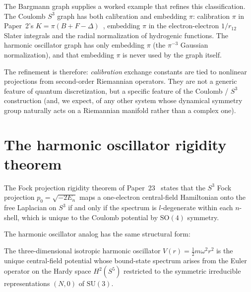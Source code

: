 \documentclass[twocolumn,pra,amsmath,amssymb,superscriptaddress]{revtex4-2}
\begin{document}
The Bargmann graph supplies a worked example that refines this
classification.  The Coulomb $S^3$ graph has both calibration and
embedding $\pi$: calibration $\pi$ in Paper~2's $K = \pi(B + F -
\Delta)$~\cite{paper2_alpha}, embedding $\pi$ in the
electron-electron $1/r_{12}$ Slater integrals and the radial
normalization of hydrogenic functions.  The harmonic oscillator
graph has only embedding $\pi$ (the $\pi^{-3}$ Gaussian
normalization), and that embedding $\pi$ is never used by the
graph itself.

The refinement is therefore: \emph{calibration} exchange
constants are tied to nonlinear projections from second-order
Riemannian operators.  They are not a generic feature of quantum
discretization, but a specific feature of the Coulomb / $S^3$
construction (and, we expect, of any other system whose dynamical
symmetry group naturally acts on a Riemannian manifold rather
than a complex one).

\section{The harmonic oscillator rigidity theorem}
\label{sec:rigidity}

The Fock projection rigidity theorem of Paper~23~\cite{paper23}
states that the $S^3$ Fock projection $p_0 = \sqrt{-2 E_n}$ maps
a one-electron central-field Hamiltonian onto the free Laplacian
on $S^3$ if and only if the spectrum is $l$-degenerate within each
$n$-shell, which is unique to the Coulomb potential by
$\mathrm{SO}(4)$ symmetry.

The harmonic oscillator analog has the same structural form:

\begin{theorem}
\label{thm:rigidity}
The three-dimensional isotropic harmonic oscillator $V(r) =
\frac{1}{2} m \omega^2 r^2$ is the unique central-field
potential whose bound-state spectrum arises from the Euler
operator on the Hardy space $H^2(S^5)$ restricted to the
symmetric irreducible representations $(N, 0)$ of $\mathrm{SU}(3)$.
\end{theorem}
\end{document}
